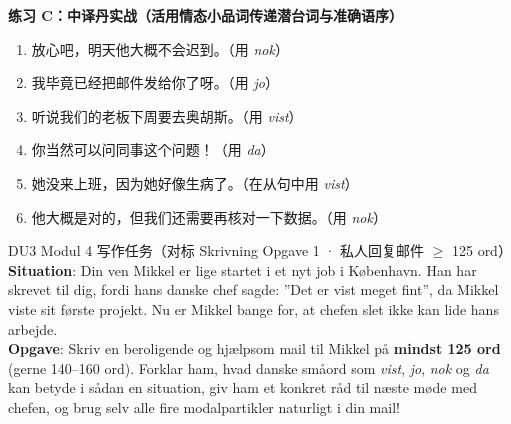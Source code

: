 \textbf{练习 C：中译丹实战（活用情态小品词传递潜台词与准确语序）}
\begin{enumerate}
  \item 放心吧，明天他大概不会迟到。（用 \textit{nok}）
  \item 我毕竟已经把邮件发给你了呀。（用 \textit{jo}）
  \item 听说我们的老板下周要去奥胡斯。（用 \textit{vist}）
  \item 你当然可以问同事这个问题！（用 \textit{da}）
  \item 她没来上班，因为她好像生病了。（在从句中用 \textit{vist}）
  \item 他大概是对的，但我们还需要再核对一下数据。（用 \textit{nok}）
\end{enumerate}


\begin{emailbox}{DU3 Modul 4 写作任务（对标 Skrivning Opgave 1 · 私人回复邮件 $\ge$ 125 ord）}
\textbf{Situation}: Din ven Mikkel er lige startet i et nyt job i København. Han har skrevet til dig, fordi hans danske chef sagde: ”Det er vist meget fint”, da Mikkel viste sit første projekt. Nu er Mikkel bange for, at chefen slet ikke kan lide hans arbejde.\\
\textbf{Opgave}: Skriv en beroligende og hjælpsom mail til Mikkel på \textbf{mindst 125 ord} (gerne 140--160 ord). Forklar ham, hvad danske småord som \textit{vist}, \textit{jo}, \textit{nok} og \textit{da} kan betyde i sådan en situation, giv ham et konkret råd til næste møde med chefen, og brug selv alle fire modalpartikler naturligt i din mail!
\end{emailbox}


